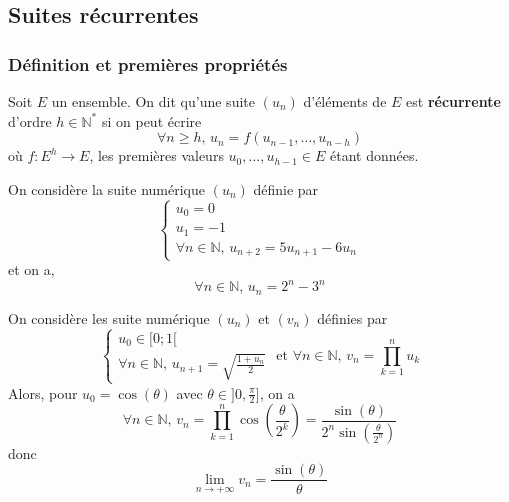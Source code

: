 




  \subsection{Suites récurrentes}

  \subsubsection{Définition et premières propriétés}


  \begin{definition}
    Soit $E$ un ensemble. On dit qu'une suite $(u_n)$ d'éléments de $E$ est \textbf{récurrente} d'ordre $h \in \mathbb{N}^*$ si on peut écrire
    \[ \forall n \geq h, \, u_n = f(u_{n-1}, \dots, u_{n-h}) \tag{$*$} \]
    où $f : E^h \rightarrow E$, les premières valeurs $u_0, \dots, u_{h-1} \in E$ étant données.
  \end{definition}

  \begin{example}
    On considère la suite numérique $(u_n)$ définie par
    \[
      \begin{cases}
        u_0 = 0 \\
        u_1 = -1 \\
        \forall n \in \mathbb{N}, \, u_{n+2} = 5u_{n+1} - 6u_n
      \end{cases}
    \]
    et on a,
    \[ \forall n \in \mathbb{N}, \, u_n = 2^n - 3^n \]
  \end{example}


  \begin{example}
    On considère les suite numérique $(u_n)$ et $(v_n)$ définies par
    \[
      \begin{cases}
        u_0 \in [0;1[ \\
        \forall n \in \mathbb{N}, \, u_{n+1} = \sqrt{\frac{1+u_n}{2}}
      \end{cases}
      \text{ et }
      \forall n \in \mathbb{N}, \, v_n = \prod_{k=1}^{n} u_k
    \]
    Alors, pour $u_0 = \cos(\theta)$ avec $\theta \in ]0,\frac{\pi}{2}]$, on a
    \[ \forall n \in \mathbb{N}, \, v_n = \prod_{k=1}^n \cos \left( \frac{\theta}{2^k} \right) = \frac{\sin(\theta)}{2^n \sin \left( \frac{\theta}{2^n} \right)} \]
    donc
    \[ \lim_{n \rightarrow +\infty} v_n = \frac{\sin(\theta)}{\theta} \]
  \end{example}

